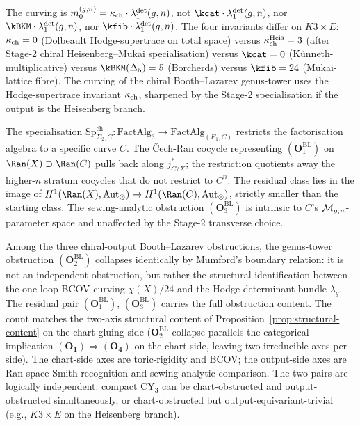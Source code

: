 \begin{remark}
The curving is $m_0^{(g, n)} = \kappa_{\mathrm{ch}} \cdot \lambda^{\det}_1(g,n)$, not
$\kcat \cdot \lambda^{\det}_1(g,n)$, nor
$\kBKM \cdot \lambda^{\det}_1(g,n)$, nor
$\kfib \cdot \lambda^{\det}_1(g,n)$. The four invariants differ on $K3 \times E$:
$\kappa_{\mathrm{ch}} = 0$ (Dolbeault Hodge-supertrace on total space) versus
$\kappa_{\mathrm{ch}}^{\mathrm{Heis}} = 3$ (after Stage-2 chiral Heisenberg--Mukai
specialisation) versus $\kcat = 0$ (Künneth-multiplicative) versus
$\kBKM(\Delta_5) = 5$ (Borcherds) versus $\kfib = 24$
(Mukai-lattice fibre). The curving of the chiral Booth--Lazarev
genus-tower uses the Hodge-supertrace invariant $\kappa_{\mathrm{ch}}$, sharpened
by the Stage-2 specialisation if the output is the Heisenberg
branch.
\end{remark}

\begin{remark}
The specialisation
$\mathrm{Sp}^{\mathrm{ch}}_{\Sigma_2, C} : \mathrm{FactAlg}_3
\to \mathrm{FactAlg}_{(E_1, C)}$ restricts the factorisation
algebra to a specific curve $C$. The \v{C}ech-Ran cocycle
representing $(\mathbf{O}_1^{\mathrm{BL}})$ on $\Ran(X) \supset \Ran(C)$
pulls back along $j^*_{C/X}$; the restriction quotients away the
higher-$n$ stratum cocycles that do not restrict to $C^n$. The
residual class lies in the image of
$H^1(\Ran(X), \mathrm{Aut}_\otimes) \to H^1(\Ran(C),
\mathrm{Aut}_\otimes)$, strictly smaller than the starting class.
The sewing-analytic obstruction $(\mathbf{O}_3^{\mathrm{BL}})$ is
intrinsic to $C$'s $\overline{\mathcal{M}}_{g, n}$-parameter space and unaffected
by the Stage-2 transverse choice.
\end{remark}

\begin{remark}
\label{rem:bl-obstruction-count}
Among the three chiral-output Booth--Lazarev obstructions, the
genus-tower obstruction $(\mathbf{O}_2^{\mathrm{BL}})$ collapses
identically by Mumford's boundary relation: it is not an
independent obstruction, but rather the structural identification
between the one-loop BCOV curving $\chi(X)/24$ and the Hodge
determinant bundle $\lambda_g$. The residual pair
$(\mathbf{O}_1^{\mathrm{BL}})$, $(\mathbf{O}_3^{\mathrm{BL}})$
carries the full obstruction content. The count matches the two-axis
structural content of Proposition~\ref{prop:structural-content} on the
chart-gluing side ($\mathbf{O}_2^{\mathrm{BL}}$ collapse parallels
the categorical implication $(\mathbf{O_1}) \Rightarrow
(\mathbf{O_4})$ on the chart side, leaving two irreducible axes per
side). The chart-side axes are toric-rigidity and BCOV; the
output-side axes are Ran-space Smith recognition and sewing-analytic
comparison. The two pairs are logically independent: compact CY$_3$
can be chart-obstructed and output-obstructed simultaneously, or
chart-obstructed but output-equivariant-trivial (e.g., $K3 \times E$
on the Heisenberg branch).
\end{remark}
